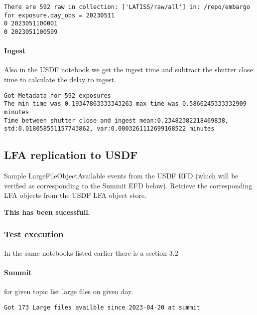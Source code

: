 \begin{lstlisting}
There are 592 raw in collection: ['LATISS/raw/all'] in: /repo/embargo for exposure.day_obs = 20230511
0 2023051100001
0 2023051100599
\end{lstlisting}

\paragraph {Ingest}
Also in the USDF notebook we get the ingest time and subtract the shutter close time to calculate the
delay to ingest.
\begin{lstlisting}
Got Metadata for 592 exposures
The min time was 0.19347863333343263 max time was 0.5866245333332909 minutes
Time between shutter close and ingest mean:0.23482382218469838, std:0.018058551157743862, var:0.0003261112699168522 minutes
\end{lstlisting}

\subsection{LFA replication to USDF }
Sample LargeFileObjectAvailable events from the USDF EFD (which will be verified as corresponding to the Summit EFD below).
Retrieve the corresponding LFA objects from the USDF LFA object store.

\textbf{This has been sucessfull.}
\subsubsection{Test execution}
In the same notebooks  listed earlier there is a section 3.2

\paragraph{Summit} for given topic list large files on given day.
\begin{lstlisting}
Got 173 Large files availble since 2023-04-20 at summit
\end{lstlisting}

